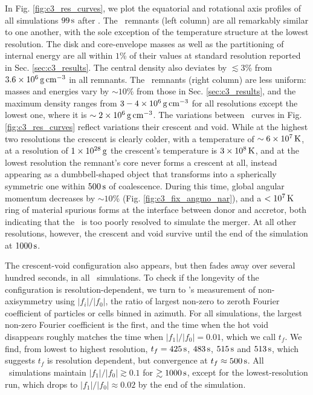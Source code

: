 In Fig. \ref{fig:c3_res_curves}, we plot the equatorial and rotational axis profiles of all simulations $99\,\mathrm{s}$ after \tcoal.  The \gasoline\ remnants (left column) are all remarkably similar to one another, with the sole exception of the temperature structure at the lowest resolution.  The disk and core-envelope masses as well as the partitioning of internal energy are all within $1$\% of their values at standard resolution reported in Sec. \ref{sec:c3_results}.  The central density also deviates by $\lesssim3$\% from $3.6\times10^{6}\,\gcc$ in all remnants.  The \arepo\ remnants (right column) are less uniform: masses and energies vary by $\sim10$\% from those in Sec. \ref{sec:c3_results}, and the maximum density ranges from $3-4\times10^6\,\gcc$ for all resolutions except the lowest one, where it is $\sim2\times10^6\,\gcc$.  The variations between \arepo\ curves in Fig. \ref{fig:c3_res_curves} reflect variations their crescent and void.  While at the highest two resolutions the crescent is clearly colder, with a temperature of $\sim6\times10^7\,\mathrm{K}$, at a resolution of $1\times10^{28}\,\mathrm{g}$ the crescent's temperature is $3\times10^8\,\mathrm{K}$, and at the lowest resolution the remnant's core never forms a crescent at all, instead appearing as a dumbbell-shaped object that transforms into a spherically symmetric one within $500\,\mathrm{s}$ of coalescence.  During this time, global angular momentum decreases by $\sim10$\% (Fig. \ref{fig:c3_fix_angmo_nar}), and a $<10^7\,\mathrm{K}$ ring of material spurious forms at the interface between donor and accretor, both indicating that the \arepo\ is too poorly resolved to simulate the merger.  At all other resolutions, however, the crescent and void survive until the end of the simulation at $1000\,\mathrm{s}$.

The crescent-void configuration also appears, but then fades away over several hundred seconds, in all \gasoline\ simulations.  To check if the longevity of the configuration is resolution-dependent, we turn to \citeal{zhu+13}'s measurement of non-axisymmetry using $|f_i|/|f_0|$, the ratio of largest non-zero to zeroth Fourier coefficient of particles or cells binned in azimuth.  For all simulations, the largest non-zero Fourier coefficient is the first, and the time when the hot void disappears roughly matches the time when $|f_1|/|f_0| = 0.01$, which we call $t_f$.  We find, from lowest to highest resolution, $t_f = 425\,\mathrm{s}$, $483\,\mathrm{s}$, $515\,\mathrm{s}$ and $513\,\mathrm{s}$, which suggests $t_f$ is resolution dependent, but convergence at $t_f \approx 500\,\mathrm{s}$.   All \arepo\ simulations maintain $|f_1|/|f_0| \gtrsim 0.1$ for $\gtrsim 1000\,\mathrm{s}$, except for the lowest-resolution run, which drops to $|f_1|/|f_0| \approx 0.02$ by the end of the simulation.

